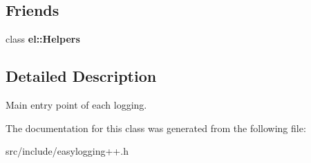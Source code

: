 \subsection*{Friends}
\begin{DoxyCompactItemize}
\item 
\mbox{\label{classel_1_1base_1_1_writer_a2fb8a2c02cbf86247f093c118bed877a}} 
class {\bfseries el\+::\+Helpers}
\end{DoxyCompactItemize}


\subsection{Detailed Description}
Main entry point of each logging. 

The documentation for this class was generated from the following file\+:\begin{DoxyCompactItemize}
\item 
src/include/easylogging++.\+h\end{DoxyCompactItemize}
